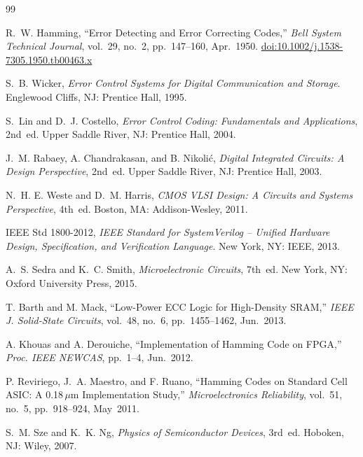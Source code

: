 \documentclass[12pt,a4paper]{article}
\begin{document}
\begin{thebibliography}{99}

  R.~W. Hamming,
  ``Error Detecting and Error Correcting Codes,''
  \textit{Bell System Technical Journal},
  vol.~29, no.~2, pp.~147--160, Apr.\ 1950.
  \href{https://doi.org/10.1002/j.1538-7305.1950.tb00463.x}{doi:10.1002/j.1538-7305.1950.tb00463.x}

  S.~B. Wicker,
  \textit{Error Control Systems for Digital Communication and Storage}.
  Englewood Cliffs, NJ: Prentice Hall, 1995.

  S.~Lin and D.~J. Costello,
  \textit{Error Control Coding: Fundamentals and Applications}, 2nd~ed.
  Upper Saddle River, NJ: Prentice Hall, 2004.

  J.~M. Rabaey, A. Chandrakasan, and B. Nikolić,
  \textit{Digital Integrated Circuits: A Design Perspective}, 2nd~ed.
  Upper Saddle River, NJ: Prentice Hall, 2003.

  N.~H. E. Weste and D.~M. Harris,
  \textit{CMOS VLSI Design: A Circuits and Systems Perspective}, 4th~ed.
  Boston, MA: Addison-Wesley, 2011.

  IEEE Std 1800-2012,
  \textit{IEEE Standard for SystemVerilog -- Unified Hardware Design, Specification, and Verification Language}.
  New York, NY: IEEE, 2013.

  A.~S. Sedra and K.~C. Smith,
  \textit{Microelectronic Circuits}, 7th~ed.
  New York, NY: Oxford University Press, 2015.

  T. Barth and M. Mack,
  ``Low-Power ECC Logic for High-Density SRAM,''
  \textit{IEEE J. Solid-State Circuits}, vol.~48, no.~6, pp.~1455--1462, Jun.\ 2013.

  A. Khouas and A. Derouiche,
  ``Implementation of Hamming Code on FPGA,''
  \textit{Proc. IEEE NEWCAS}, pp.~1--4, Jun.\ 2012.

  P. Reviriego, J.~A. Maestro, and F. Ruano,
  ``Hamming Codes on Standard Cell ASIC: A 0.18$\,\mu$m Implementation Study,''
  \textit{Microelectronics Reliability}, vol.~51, no.~5, pp.~918--924, May~2011.

  S.~M. Sze and K.~K. Ng,
  \textit{Physics of Semiconductor Devices}, 3rd~ed.
  Hoboken, NJ: Wiley, 2007.

\end{thebibliography}
\end{document}
